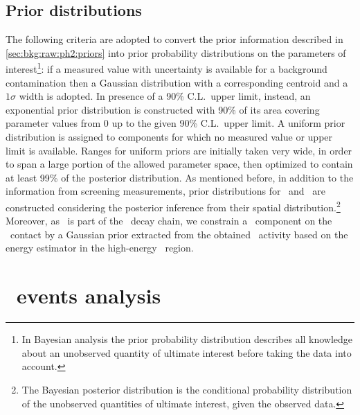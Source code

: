 \subsection{Prior distributions}

The following criteria are adopted to convert the prior information described in
\cref{sec:bkg:raw:ph2:priors} into prior probability distributions on the parameters of
interest\footnote{In Bayesian analysis the prior probability distribution describes all
knowledge about an unobserved quantity of ultimate interest before taking the data into
account.}: if a measured value with uncertainty is available for a background
contamination then a Gaussian distribution with a corresponding centroid and a $1\sigma$
width is adopted. In presence of a 90\% C.L.~upper limit, instead, an exponential prior
distribution is constructed with 90\% of its area covering parameter values from 0 up to
the given 90\% C.L.~upper limit. A uniform prior distribution is assigned to components
for which no measured value or upper limit is available. Ranges for uniform priors are
initially taken very wide, in order to span a large portion of the allowed parameter
space, then optimized to contain at least 99\% of the posterior distribution. As mentioned
before, in addition to the information from screening measurements, prior distributions
for \kvn\ and \kvz\ are constructed considering the posterior inference from their spatial
distribution.\footnote{The Bayesian posterior distribution is the conditional probability
distribution of the unobserved quantities of ultimate interest, given the observed
data.} Moreover, as \Bih\ is part of the \Ra\ decay chain, we constrain a \Bih\ component
on the \pplus\ contact by a Gaussian prior extracted from the obtained \Ra\ activity based
on the energy estimator in the high-energy \a\ region.

\section{\texorpdfstring{\a\ events analysis}{alpha events analysis}}%
\label{sec:bkg:raw:ph2:amodel}

